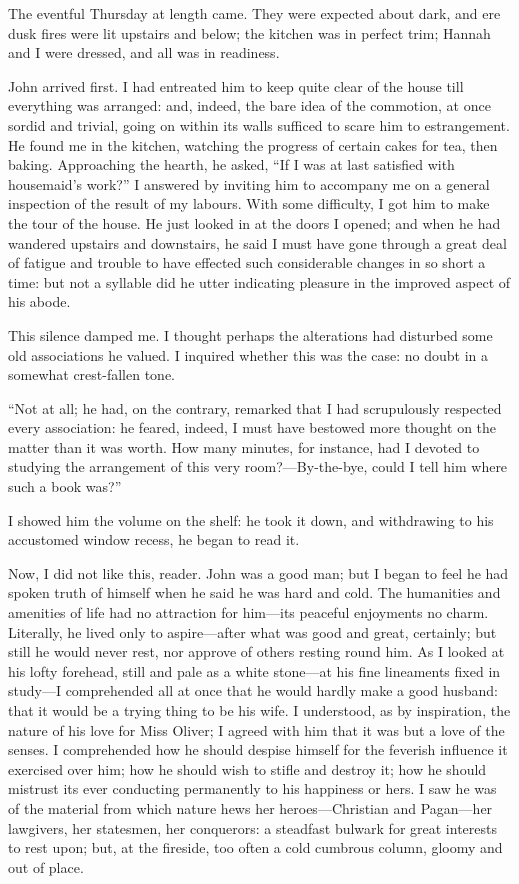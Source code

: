 The eventful Thursday at length came. They were expected about dark,
and ere dusk fires were lit upstairs and below; the kitchen was in
perfect trim; Hannah and I were dressed, and all was in readiness.

\St{} John arrived first. I had entreated him to keep quite clear of the
house till everything was arranged: and, indeed, the bare idea of the
commotion, at once sordid and trivial, going on within its walls
sufficed to scare him to estrangement. He found me in the kitchen,
watching the progress of certain cakes for tea, then baking.
Approaching the hearth, he asked, \enquote{If I was at last satisfied
	with housemaid's work?} I answered by inviting him to accompany me on a
general inspection of the result of my labours. With some difficulty, I
got him to make the tour of the house. He just looked in at the doors I
opened; and when he had wandered upstairs and downstairs, he said I must
have gone through a great deal of fatigue and trouble to have effected
such considerable changes in so short a time: but not a syllable did he
utter indicating pleasure in the improved aspect of his abode.

This silence damped me. I thought perhaps the alterations had disturbed
some old associations he valued. I inquired whether this was the case:
no doubt in a somewhat crest-fallen tone.

\enquote{Not at all; he had, on the contrary, remarked that I had
	scrupulously respected every association: he feared, indeed, I must have
	bestowed more thought on the matter than it was worth. How many
	minutes, for instance, had I devoted to studying the arrangement of this
	very room?---By-the-bye, could I tell him where such a book was?}

I showed him the volume on the shelf: he took it down, and withdrawing
to his accustomed window recess, he began to read it.

Now, I did not like this, reader. \St{} John was a good man; but I began
to feel he had spoken truth of himself when he said he was hard and
cold. The humanities and amenities of life had no attraction for
him---its peaceful enjoyments no charm. Literally, he lived only to
aspire---after what was good and great, certainly; but still he would
never rest, nor approve of others resting round him. As I looked at his
lofty forehead, still and pale as a white stone---at his fine lineaments
fixed in study---I comprehended all at once that he would hardly make a
good husband: that it would be a trying thing to be his wife. I
understood, as by inspiration, the nature of his love for Miss Oliver; I
agreed with him that it was but a love of the senses. I comprehended
how he should despise himself for the feverish influence it exercised
over him; how he should wish to stifle and destroy it; how he should
mistrust its ever conducting permanently to his happiness or hers. I
saw he was of the material from which nature hews her heroes---Christian
and Pagan---her lawgivers, her statesmen, her conquerors: a steadfast
bulwark for great interests to rest upon; but, at the fireside, too
often a cold cumbrous column, gloomy and out of place.

